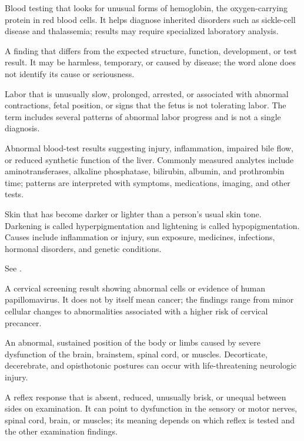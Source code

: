  Blood testing that looks for unusual forms of hemoglobin, the oxygen-carrying protein in red blood cells. It helps diagnose inherited disorders such as sickle-cell disease and thalassemia; results may require specialized laboratory analysis.

 A finding that differs from the expected structure, function, development, or test result. It may be harmless, temporary, or caused by disease; the word alone does not identify its cause or seriousness.

 Labor that is unusually slow, prolonged, arrested, or
associated with abnormal contractions, fetal position, or signs that the fetus
is not tolerating labor. The term includes several patterns of abnormal labor
progress and is not a single diagnosis.

 Abnormal blood-test results suggesting injury, inflammation, impaired bile flow, or reduced synthetic function of the liver. Commonly measured analytes include aminotransferases, alkaline phosphatase, bilirubin, albumin, and prothrombin time; patterns are interpreted with symptoms, medications, imaging, and other tests.

 Skin that has become darker or lighter than a person's usual skin tone. Darkening is called
hyperpigmentation and lightening is called hypopigmentation. Causes include inflammation or injury, sun exposure,
medicines, infections, hormonal disorders, and genetic conditions.

 See .

 A cervical screening result showing abnormal cells
or evidence of human papillomavirus. It does not by itself mean cancer; the
findings range from minor cellular changes to abnormalities associated with a
higher risk of cervical precancer.

 An abnormal, sustained position of the body or limbs caused by severe dysfunction of the brain, brainstem, spinal cord, or muscles. Decorticate, decerebrate, and opisthotonic postures can occur with life-threatening neurologic injury.

 A reflex response that is absent, reduced, unusually brisk, or unequal between sides on examination. It can point to dysfunction in the sensory or motor nerves, spinal cord, brain, or muscles; its meaning depends on which reflex is tested and the other examination findings.

